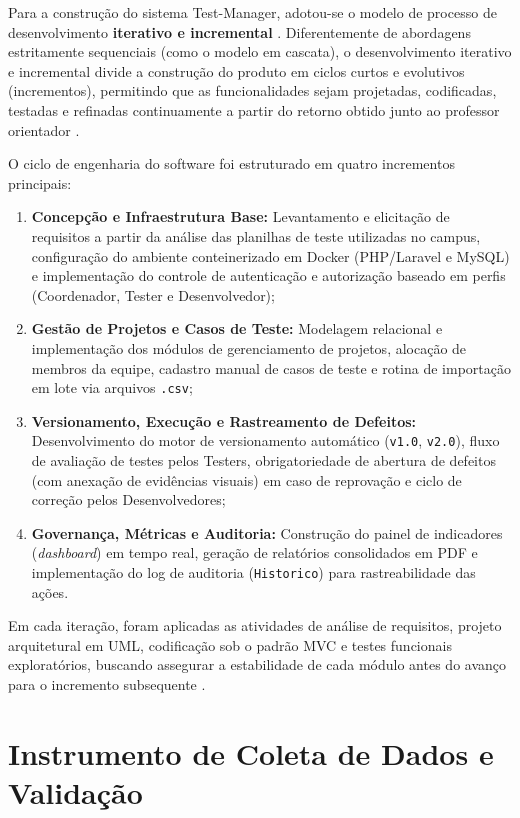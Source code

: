 Para a construção do sistema Test-Manager, adotou-se o modelo de processo de desenvolvimento \textbf{iterativo e incremental} \cite{pressman2016, sommerville2019}. Diferentemente de abordagens estritamente sequenciais (como o modelo em cascata), o desenvolvimento iterativo e incremental divide a construção do produto em ciclos curtos e evolutivos (incrementos), permitindo que as funcionalidades sejam projetadas, codificadas, testadas e refinadas continuamente a partir do retorno obtido junto ao professor orientador \cite{pressman2016, sommerville2019}.

O ciclo de engenharia do software foi estruturado em quatro incrementos principais:
\begin{enumerate}
    \item \textbf{Concepção e Infraestrutura Base:} Levantamento e elicitação de requisitos a partir da análise das planilhas de teste utilizadas no campus, configuração do ambiente conteinerizado em Docker (PHP/Laravel e MySQL) e implementação do controle de autenticação e autorização baseado em perfis (Coordenador, Tester e Desenvolvedor);
    \item \textbf{Gestão de Projetos e Casos de Teste:} Modelagem relacional e implementação dos módulos de gerenciamento de projetos, alocação de membros da equipe, cadastro manual de casos de teste e rotina de importação em lote via arquivos \texttt{.csv};
    \item \textbf{Versionamento, Execução e Rastreamento de Defeitos:} Desenvolvimento do motor de versionamento automático (\texttt{v1.0}, \texttt{v2.0}), fluxo de avaliação de testes pelos Testers, obrigatoriedade de abertura de defeitos (com anexação de evidências visuais) em caso de reprovação e ciclo de correção pelos Desenvolvedores;
    \item \textbf{Governança, Métricas e Auditoria:} Construção do painel de indicadores (\textit{dashboard}) em tempo real, geração de relatórios consolidados em PDF e implementação do log de auditoria (\texttt{Historico}) para rastreabilidade das ações.
\end{enumerate}

Em cada iteração, foram aplicadas as atividades de análise de requisitos, projeto arquitetural em UML, codificação sob o padrão MVC e testes funcionais exploratórios, buscando assegurar a estabilidade de cada módulo antes do avanço para o incremento subsequente \cite{sommerville2019}.

\section{Instrumento de Coleta de Dados e Validação}

